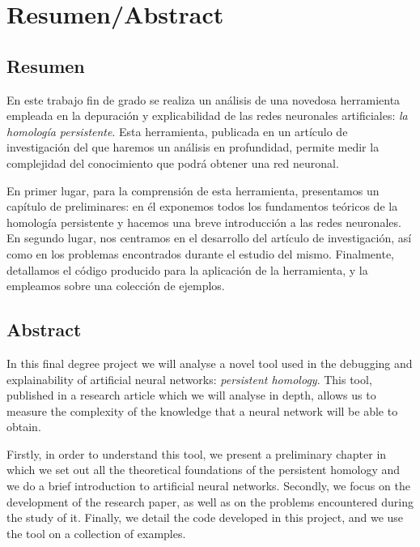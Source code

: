 \documentclass[12pt, a4paper, twoside]{book}
\numberwithin{equation}{section}
\theoremstyle{definition}
\theoremstyle{remark}
\theoremstyle{plain}
\begin{document}
	
	
	\pagestyle{main}

	
	
	\chapter*{Resumen/Abstract}
	\section*{Resumen}
	En este trabajo fin de grado se realiza un análisis de una novedosa 
	herramienta empleada en la depuración y explicabilidad de las redes 
	neuronales artificiales: \emph{la homología persistente}. Esta 
	herramienta, publicada en un artículo de investigación del que haremos 
	un análisis en profundidad, permite medir la complejidad del 
	conocimiento que podrá obtener una red neuronal. 

	En primer lugar, para la comprensión de esta herramienta, presentamos 
	un capítulo de preliminares: en él exponemos todos los fundamentos 
	teóricos de la homología persistente y hacemos una breve introducción a 
	las redes neuronales. En segundo lugar, nos centramos en el desarrollo 
	del artículo de investigación, así como en los problemas encontrados 
	durante el estudio del mismo. Finalmente, detallamos el código 
	producido para la aplicación de la herramienta, y la empleamos sobre 
	una colección de ejemplos. 
	\section*{Abstract}
	In this final degree project we will analyse a novel tool used in the 
	debugging and explainability of artificial neural networks: 
	\emph{persistent homology}. This tool, published in a research article 
	which we will analyse in depth, allows us to measure the complexity of 
	the knowledge that a neural network will be able to obtain. 

	Firstly, in order to understand this tool, we present 
	a preliminary chapter in which we set out all the theoretical 
	foundations of the persistent homology and we do a brief introduction 
	to artificial neural networks. Secondly, we focus on the development 
	of the research paper, as well as on the problems encountered during 
	the study of it. Finally, we detail the code developed in this project, 
	and we use the tool on a collection of examples.  
\end{document}
